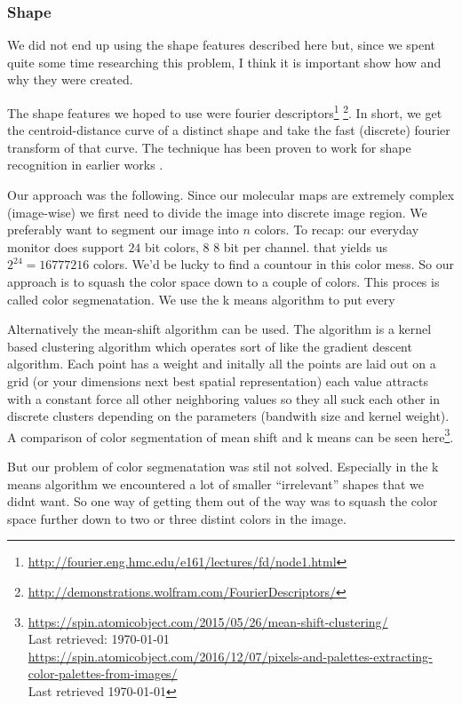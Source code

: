 \documentclass[journal]{vgtc}       %
\begin{document}
\subsubsection{Shape}
We did not end up using the shape features described here but, since we spent quite some time researching this problem, I think it is important show how and why they were created.

The shape features we hoped to use were  fourier descriptors\footnote{\url{http://fourier.eng.hmc.edu/e161/lectures/fd/node1.html} } \footnote{\url{http://demonstrations.wolfram.com/FourierDescriptors/}}. In short, we get the centroid-distance curve of a distinct shape and take the fast (discrete) fourier transform of that curve. The technique has been proven to work for shape recognition  in earlier works \cite{fourierd}.

Our approach was the following.  Since our molecular maps are extremely complex (image-wise) we first need to divide the image into discrete image region.  We preferably want to segment our image into $n$ colors. To recap: our everyday monitor does support \(24\) bit colors, \(8 \) 8 bit per channel. that yields us \(2^{24}=16777216 \) colors.
We'd be lucky to find a countour in this color mess.
So our approach is to squash the color space down to a couple of colors.
This proces is called color segmenatation. We use the k means algorithm to put every 

Alternatively the mean-shift algorithm can be used. The algorithm is a kernel based clustering algorithm which operates sort of like the gradient descent algorithm.
Each point has a weight and initally all the points are laid out on a grid (or your dimensions next best spatial representation) each value attracts with a constant force all other neighboring values so they all suck each other in discrete clusters depending on the parameters (bandwith size and kernel weight). A comparison of color segmentation of mean shift and  k means can be seen here\footnote{\url{https://spin.atomicobject.com/2015/05/26/mean-shift-clustering/} \\ Last retrieved: \today \\ \url{https://spin.atomicobject.com/2016/12/07/pixels-and-palettes-extracting-color-palettes-from-images/} \\ Last retrieved \today}. 


But our problem of color segmenatation was stil not solved. Especially in the k means algorithm we encountered a lot of smaller ``irrelevant'' shapes that we didnt want.
So one way of getting them out of the way was to squash the color space further down to two or three distint colors in the image.
\end{document}
